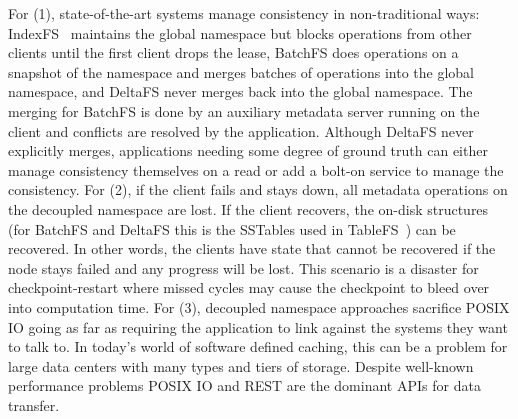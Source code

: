 For (1), state-of-the-art systems manage consistency in non-traditional ways:
IndexFS~\cite{ren:sc2014-indexfs} maintains the global namespace but blocks operations from other clients
until the first client drops the lease, BatchFS does operations on a snapshot
of the namespace and merges batches of operations into the global namespace,
and DeltaFS never merges back into the global namespace. The merging for
BatchFS is done by an auxiliary metadata server running on the client and
conflicts are resolved by the application. Although DeltaFS never explicitly
merges, applications needing some degree of ground truth can either manage
consistency themselves on a read or add a bolt-on service to manage the
consistency. For (2), if the client fails and stays down, all metadata
operations on the decoupled namespace are lost. If the client recovers, the
on-disk structures (for BatchFS and DeltaFS this is the SSTables used in
TableFS~\cite{ren:atc2013-tablefs}) can be recovered. In other words, the clients have state that cannot
be recovered if the node stays failed and any progress will be lost. This
scenario is a disaster for checkpoint-restart where missed cycles may cause the
checkpoint to bleed over into computation time. For (3), decoupled namespace
approaches sacrifice POSIX IO going as far as requiring the application to link
against the systems they want to talk to. In today's world of software defined
caching, this can be a problem for large data centers with many types and tiers
of storage. Despite well-known performance problems POSIX IO and REST are the
dominant APIs for data transfer.
